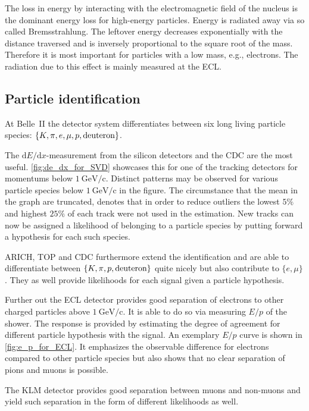 The loss in energy by interacting with the electromagnetic field of the nucleus is the dominant energy loss for high-energy particles. Energy is radiated away via so called Bremsstrahlung. The leftover energy decreases exponentially with the distance traversed and is inversely proportional to the square root of the mass. Therefore it is most important for particles with a low mass, e.g., electrons.
The radiation due to this effect is mainly measured at the ECL.

\subsection{Particle identification}
\label{subsec:particle_identification}

At Belle~\RN{2} the detector system differentiates between six long living particle species: $\{K, \pi, e, \mu, p, \hbox{deuteron}\}$.

The $\mathrm{d}E/\mathrm{d}x$-measurement from the silicon detectors and the CDC are the most useful. \autoref{fig:de_dx_for_SVD} showcases this for one of the tracking detectors for momentums below $1 \mathrm{~GeV/c}$. Distinct patterns may be observed for various particle species below $1 \mathrm{~GeV/c}$ in the figure. The circumstance that the mean in the graph are truncated, denotes that in order to reduce outliers the lowest $5\%$ and highest $25\%$ of each track were not used in the estimation.
New tracks can now be assigned a likelihood of belonging to a particle species by putting forward a hypothesis for each such species.

ARICH, TOP and CDC furthermore extend the identification and are able to differentiate between $\{K, \pi, p, \hbox{deuteron}\}$ quite nicely but also contribute to $\{e, \mu\}$. They as well provide likelihoods for each signal given a particle hypothesis.

Further out the ECL detector provides good separation of electrons to other charged particles above $1 \mathrm{~GeV/c}$. It is able to do so via measuring $E/p$ of the shower. The response is provided by estimating the degree of agreement for different particle hypothesis with the signal. An exemplary $E/p$ curve is shown in \autoref{fig:e_p_for_ECL}. It emphasizes the observable difference for electrons compared to other particle species but also shows that no clear separation of pions and muons is possible.

The KLM detector provides good separation between muons and non-muons and yield such separation in the form of different likelihoods as well.

